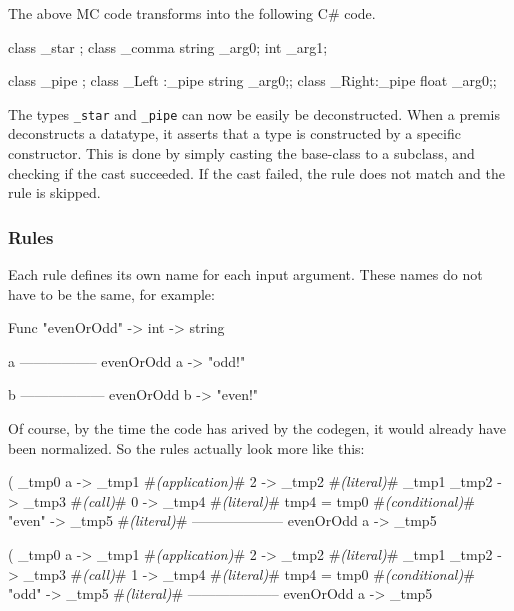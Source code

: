 The above MC code transforms into the following C\# code.

\begin{CS}
class _star {};
class _comma { string _arg0; int _arg1;}

class _pipe {};
class _Left :_pipe {string _arg0;};
class _Right:_pipe {float  _arg0;};
\end{CS}

The types \verb|_star| and \verb|_pipe| can now be easily be deconstructed.
When a premis deconstructs a datatype, it asserts that a type is constructed by a specific constructor.
This is done by simply casting the base-class to a subclass, and checking if the cast succeeded.
If the cast failed, the rule does not match and the rule is skipped.

\subsubsection{Rules}\label{codegen_rules}

Each rule defines its own name for each input argument.
These names do not have to be the same, for example:

\begin{MC}
    Func "evenOrOdd" -> int -> string
    
    a%
    -----------------
    evenOrOdd a -> "odd!"

    b%
    ------------------
    evenOrOdd b -> "even!"
\end{MC}

Of course, by the time the code has arived by the codegen, it would already have been normalized.
So the rules actually look more like this:

\begin{MC}[escapeinside=\#\#]
    (%
    _tmp0 a -> _tmp1     #\textit{(application)}#
    2 -> _tmp2           #\textit{(literal)}#
    _tmp1 _tmp2 -> _tmp3 #\textit{(call)}#
    0 -> _tmp4           #\textit{(literal)}#
    tmp4 = tmp0          #\textit{(conditional)}#
    "even" -> _tmp5      #\textit{(literal)}#
    --------------------
    evenOrOdd a -> _tmp5
\end{MC}

\begin{MC}[escapeinside=\#\#]
    (%
    _tmp0 a -> _tmp1     #\textit{(application)}#
    2 -> _tmp2           #\textit{(literal)}#
    _tmp1 _tmp2 -> _tmp3 #\textit{(call)}#
    1 -> _tmp4           #\textit{(literal)}#
    tmp4 = tmp0          #\textit{(conditional)}#
    "odd" -> _tmp5       #\textit{(literal)}#
    --------------------
    evenOrOdd a -> _tmp5
\end{MC}

